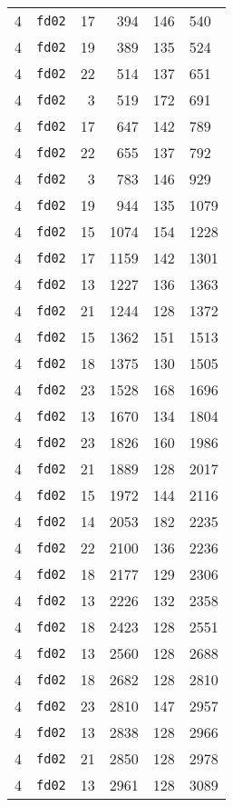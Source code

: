 \documentclass{article}
\begin{document}
\begin{table}[h!]
\begin{tabular}{llrrrl}
    4 & \texttt{fd02} & 17 & 394 & 146 & 540 \\
    4 & \texttt{fd02} & 19 & 389 & 135 & 524 \\
    4 & \texttt{fd02} & 22 & 514 & 137 & 651 \\
    4 & \texttt{fd02} & 3 & 519 & 172 & 691 \\
    4 & \texttt{fd02} & 17 & 647 & 142 & 789 \\
    4 & \texttt{fd02} & 22 & 655 & 137 & 792 \\
    4 & \texttt{fd02} & 3 & 783 & 146 & 929 \\
    4 & \texttt{fd02} & 19 & 944 & 135 & 1079 \\
    4 & \texttt{fd02} & 15 & 1074 & 154 & 1228 \\
    4 & \texttt{fd02} & 17 & 1159 & 142 & 1301 \\
    4 & \texttt{fd02} & 13 & 1227 & 136 & 1363 \\
    4 & \texttt{fd02} & 21 & 1244 & 128 & 1372 \\
    4 & \texttt{fd02} & 15 & 1362 & 151 & 1513 \\
    4 & \texttt{fd02} & 18 & 1375 & 130 & 1505 \\
    4 & \texttt{fd02} & 23 & 1528 & 168 & 1696 \\
    4 & \texttt{fd02} & 13 & 1670 & 134 & 1804 \\
    4 & \texttt{fd02} & 23 & 1826 & 160 & 1986 \\
    4 & \texttt{fd02} & 21 & 1889 & 128 & 2017 \\
    4 & \texttt{fd02} & 15 & 1972 & 144 & 2116 \\
    4 & \texttt{fd02} & 14 & 2053 & 182 & 2235 \\
    4 & \texttt{fd02} & 22 & 2100 & 136 & 2236 \\
    4 & \texttt{fd02} & 18 & 2177 & 129 & 2306 \\
    4 & \texttt{fd02} & 13 & 2226 & 132 & 2358 \\
    4 & \texttt{fd02} & 18 & 2423 & 128 & 2551 \\
    4 & \texttt{fd02} & 13 & 2560 & 128 & 2688 \\
    4 & \texttt{fd02} & 18 & 2682 & 128 & 2810 \\
    4 & \texttt{fd02} & 23 & 2810 & 147 & 2957 \\
    4 & \texttt{fd02} & 13 & 2838 & 128 & 2966 \\
    4 & \texttt{fd02} & 21 & 2850 & 128 & 2978 \\
    4 & \texttt{fd02} & 13 & 2961 & 128 & 3089 \\

\end{tabular}
\end{table}
\end{document}
